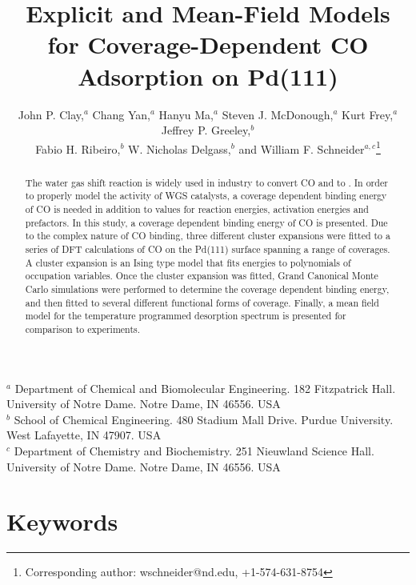 \documentclass[11pt]{article}
\begin{document}
\linenumbers
\doublespacing

\title{Explicit and Mean-Field Models for Coverage-Dependent CO Adsorption on Pd(111)}

\author{John P. Clay,$^{a}$ Chang Yan,$^{a}$ Hanyu Ma,$^{a}$ Steven J. McDonough,$^{a}$ Kurt Frey,$^{a}$ Jeffrey P. Greeley,$^{b}$\\ Fabio H. Ribeiro,$^{b}$ W. Nicholas Delgass,$^{b}$ and William F. Schneider$^{a,c}$\footnote{Corresponding author: wschneider@nd.edu, +1-574-631-8754}} 
\date{}
\maketitle
\noindent
{$^{a}$ Department of Chemical and Biomolecular Engineering. 
	        182 Fitzpatrick Hall. University of Notre Dame. Notre Dame, IN 46556. USA}\\
{$^{b}$ School of Chemical Engineering.
			480 Stadium Mall Drive. Purdue University. West Lafayette, IN 47907. USA}\\
{$^{c}$ Department of Chemistry and Biochemistry. 
			251 Nieuwland Science Hall. University of Notre Dame. Notre Dame, IN 46556.
			USA}\\

\begin{abstract}
The water gas shift reaction is widely used in industry to convert CO and  to . In order to properly model the activity of WGS catalysts, a coverage dependent binding energy of CO is needed in addition to values for reaction energies, activation energies and prefactors. In this study, a coverage dependent binding energy of CO is presented. Due to the complex nature of CO binding, three different cluster expansions were fitted to a series of DFT calculations of CO on the Pd(111) surface spanning a range of coverages. A cluster expansion is an Ising type model that fits energies to polynomials of occupation variables. Once the cluster expansion was fitted, Grand Canonical Monte Carlo simulations were performed to determine the coverage dependent binding energy, and then fitted to several different functional forms of coverage. Finally, a mean field model for the temperature programmed desorption spectrum is presented for comparison to experiments.
\end{abstract}
\newpage

\section*{Keywords}
\end{document}
